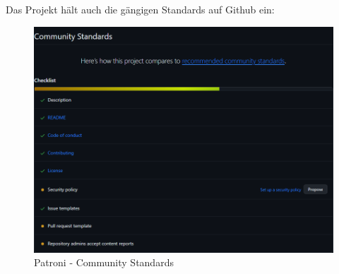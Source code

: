 \begin{flushleft}
    Das Projekt hält auch die gängigen Standards auf Github ein:
    \begin{figure}[H]
        \centering
        \includegraphics[width=0.75\linewidth]{source/implementation/evaluation/postgresql_ha_solutions/insights/patroni/community_Standards_zalando_patroni}
        \caption{Patroni - Community Standards}
        \label{fig:community_Standards_zalando_patroni}
    \end{figure}


\end{flushleft}
